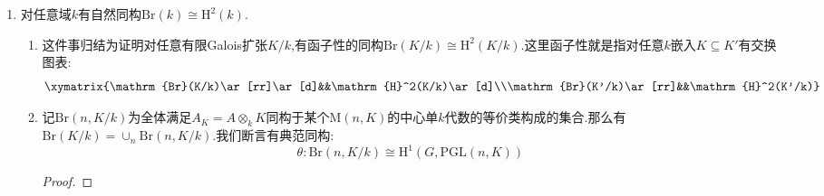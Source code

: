 \begin{enumerate}
\begin{proof}
		按照$\mathrm{H}^1(G_L,\overline{k}^*)=0$,我们有inf-res正合列:
		$$\xymatrix{0\ar[r]&\mathrm{H}^2(\mathrm{Gal}(L/k),L^*)\ar[r]^{\quad\mathrm{inf}}&\mathrm{H}^2(G_k,\overline{k}^*)\ar[r]^{\mathrm{res}\qquad}&\mathrm{H}^2(G_L,\overline{k}^*)^{\mathrm{Gal}(L/k)}\ar@{=}[r]&\mathrm{H}^2(G_L,\overline{k}^*)}$$
	\end{proof}
	\item 对任意域$k$有自然同构$\mathrm{Br}(k)\cong\mathrm{H}^2(k)$.
	\begin{enumerate}[(1)]
		\item 这件事归结为证明对任意有限Galois扩张$K/k$,有函子性的同构$\mathrm{Br}(K/k)\cong\mathrm{H}^2(K/k)$.这里函子性就是指对任意$k$嵌入$K\subseteq K'$有交换图表:
		$$\xymatrix{\mathrm{Br}(K/k)\ar[rr]\ar[d]&&\mathrm{H}^2(K/k)\ar[d]\\\mathrm{Br}(K'/k)\ar[rr]&&\mathrm{H}^2(K'/k)}$$
		\item 记$\mathrm{Br}(n,K/k)$为全体满足$A_K=A\otimes_kK$同构于某个$\mathrm{M}(n,K)$的中心单$k$代数的等价类构成的集合.那么有$\mathrm{Br}(K/k)=\cup_n\mathrm{Br}(n,K/k)$.我们断言有典范同构:
		$$\theta:\mathrm{Br}(n,K/k)\cong\mathrm{H}^1(G,\mathrm{PGL}(n,K))$$
		\begin{proof}
			

\end{proof}
\end{enumerate}
\end{enumerate}
